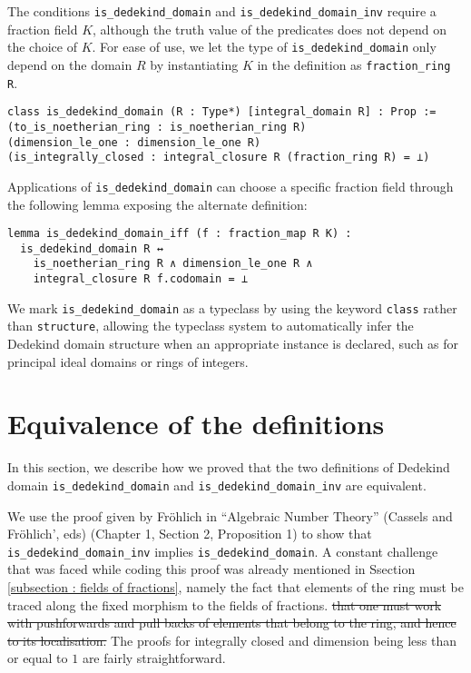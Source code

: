 \documentclass[a4paper,USenglish,cleveref, autoref, thm-restate]{lipics-v2021}
\newcommand{\lean}[1]{\texttt{#1}\xspace} %
\begin{document}
The conditions \lean{is\_dedekind\_domain} and \lean{is\_dedekind\_domain\_inv} require a fraction field $K$,
although the truth value of the predicates does not depend on the choice of $K$.
For ease of use, we let the type of \lean{is\_dedekind\_domain} only depend on the domain $R$
by instantiating $K$ in the definition as \lean{fraction\_ring R}.
\begin{lstlisting}
class is_dedekind_domain (R : Type*) [integral_domain R] : Prop :=
(to_is_noetherian_ring : is_noetherian_ring R)
(dimension_le_one : dimension_le_one R)
(is_integrally_closed : integral_closure R (fraction_ring R) = ⊥)
\end{lstlisting}
Applications of \lean{is\_dedekind\_domain} can choose a specific fraction field through the following lemma exposing the alternate definition:
\begin{lstlisting}
lemma is_dedekind_domain_iff (f : fraction_map R K) :
  is_dedekind_domain R ↔
    is_noetherian_ring R ∧ dimension_le_one R ∧
    integral_closure R f.codomain = ⊥
\end{lstlisting}

We mark \lean{is\_dedekind\_domain} as a typeclass by using the keyword \lean{class} rather than \lean{structure},
allowing the typeclass system to automatically infer the Dedekind domain structure when an appropriate instance is declared,
such as for principal ideal domains or rings of integers.

\section{Equivalence of the definitions} \label{sec:equivalence}

In this section, we describe how we proved that the two definitions of Dedekind domain \lean{is\_dedekind\_domain} and \lean{is\_dedekind\_domain\_inv} are equivalent.

We use the proof given by Fr\"ohlich in ``Algebraic Number Theory'' (Cassels and Fr\"ohlich', eds) (Chapter 1, Section 2, Proposition 1) %
to show that \lean{is\_dedekind\_domain\_inv} implies \lean{is\_dedekind\_domain}. A constant challenge that was faced while coding this proof was already mentioned in Ssection \ref{subsection : fields of fractions}, namely the fact that elements of the ring must be traced along the fixed morphism to the fields of fractions.\st{ that one must work with pushforwards and pull backs of elements that belong to the ring, and hence to its localisation.} The proofs for integrally closed and dimension being less than or equal to $1$ are fairly straightforward.
\end{document}
